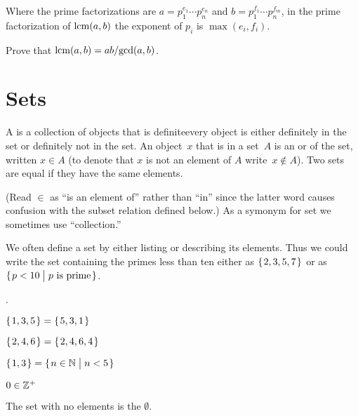 \documentclass{ibl}
\begin{document}
\begin{ex}
Where the prime factorizations are $a=p_1^{e_1}\cdots p_n^{e_n}$
and $b=p_1^{f_1}\cdots p_n^{f_m}$, 
in the prime factorization of $\operatorname{lcm}(a,b)$ the exponent of 
$p_i$ is $\max(e_i,f_i)$.
\end{ex}

\begin{ex}
Prove that $\operatorname{lcm}(a,b)=ab/\!\gcd(a,b)$.
\end{ex}











\chapter{Sets}
\begin{df}
A  is a collection of objects that is definite\Dash every 
object is either
definitely in the set or definitely not in the set.
An object~$x$ that is in a set~$A$ is an 
or 
of the set, written $x\in A$
(to denote that $x$ is not an element of $A$ write~$x\notin A$).
Two sets are equal if they have the same elements.
\end{df}
\noindent (Read $\in$ as ``is an element of'' rather than ``in'' since the 
latter word causes confusion with 
the subset relation defined below.)
As a symonym for set we sometimes use ``collection.''

We often define a set by either listing or describing its elements.
Thus we could write 
the set containing the primes less than ten 
either as $\mbox{$\{\hspace{0.1em}2, 3, 5, 7\hspace{0.1em}\}$}$ or as~$\mbox{$\{\hspace{0.1em}p<10\bigm| \text{$p$ is prime}\hspace{0.1em}\}$}$.

\begin{ex} \pord.
\begin{exes}
\item $\mbox{$\{\hspace{0.1em}1,3,5\hspace{0.1em}\}$}=\mbox{$\{\hspace{0.1em}5,3,1\hspace{0.1em}\}$}$    
\item $\mbox{$\{\hspace{0.1em}2, 4, 6\hspace{0.1em}\}$}=\mbox{$\{\hspace{0.1em}2, 4, 6, 4\hspace{0.1em}\}$}$    
\item $\mbox{$\{\hspace{0.1em}1, 3\hspace{0.1em}\}$}=\mbox{$\{\hspace{0.1em}n\in\mathbb{N}\bigm| n<5\hspace{0.1em}\}$}$ 
\item $0\in\mathbb{Z}^+$   
\end{exes}
\end{ex}

\begin{df}
The set with no elements is the  $\emptyset$.  
\end{df}
\end{document}
